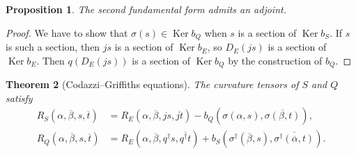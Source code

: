 \documentclass[10pt,a4paper]{amsart}
\newtheorem{theo}{Theorem}[section]
\newtheorem{prop}[theo]{Proposition}
\theoremstyle{definition}
\def\ov#1{\overline{#1}}
\DeclareMathOperator{\Ker}{Ker}
\def\snd{\sigma}
\begin{document}
\begin{prop}
The second fundamental form admits an adjoint.
\end{prop}

\begin{proof}
We have to show that $\snd(s) \in \Ker b_Q$ when $s$ is a section of $\Ker
b_S$. If $s$ is such a section, then $js$ is a section of $\Ker b_E$, so
$D_E(js)$ is a section of $\Ker b_E$. Then $q(D_E(js))$ is a section of $\Ker
b_Q$ by the construction of $b_Q$.
\end{proof}



\begin{theo}[Codazzi--Griffiths equations]
The curvature tensors of $S$ and $Q$ satisfy
\begin{align*}
R_S(\alpha, \ov\beta, s, \ov t)
&= R_E(\alpha, \ov\beta, js, \ov{jt})
- b_Q(\snd(\alpha, s), \ov{\snd(\beta, t)}),
\\
R_Q(\alpha, \ov\beta, s, \ov t)
&= R_E(\alpha, \ov\beta, q^\dagger s, \ov{q^\dagger t})
+ b_S(\snd^\dagger(\ov\beta, s), \ov{\snd^\dagger(\ov\alpha, t)}).
\end{align*}
\end{theo}
\end{document}
